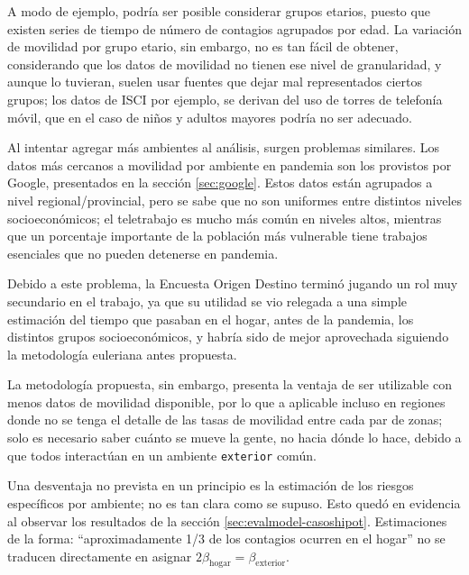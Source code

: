 A modo de ejemplo, podría ser posible considerar grupos etarios, puesto que existen series de tiempo de número de contagios agrupados por edad. La variación de movilidad por grupo etario, sin embargo, no es tan fácil de obtener, considerando que los datos de movilidad no tienen ese nivel de granularidad, y aunque lo tuvieran, suelen usar fuentes que dejar mal representados ciertos grupos; los datos de ISCI por ejemplo, se derivan del uso de torres de telefonía móvil, que en el caso de niños y adultos mayores podría no ser adecuado.

Al intentar agregar más ambientes al análisis, surgen problemas similares. Los datos más cercanos a movilidad por ambiente en pandemia son los provistos por Google, presentados en la sección \ref{sec:google}. Estos datos están agrupados a nivel regional/provincial, pero se sabe \cite{Olivares2020} que no son uniformes entre distintos niveles socioeconómicos; el teletrabajo es mucho más común en niveles altos, mientras que un porcentaje importante de la población más vulnerable tiene trabajos esenciales que no pueden detenerse en pandemia.

Debido a este problema, la Encuesta Origen Destino terminó jugando un rol muy secundario en el trabajo, ya que su utilidad se vio relegada a una simple estimación del tiempo que pasaban en el hogar, antes de la pandemia, los distintos grupos socioeconómicos, y habría sido de mejor aprovechada siguiendo la metodología euleriana antes propuesta. 

La metodología propuesta, sin embargo, presenta la ventaja de ser utilizable con menos datos de movilidad disponible, por lo que a aplicable incluso en regiones donde no se tenga el detalle de las tasas de movilidad entre cada par de zonas; solo es necesario saber cuánto se mueve la gente, no hacia dónde lo hace, debido a que todos interactúan en un ambiente \texttt{exterior} común.

Una desventaja no prevista en un principio es la estimación de los riesgos específicos por ambiente; no es tan clara como se supuso. Esto quedó en evidencia al observar los resultados de la sección \ref{sec:evalmodel-casoshipot}. Estimaciones de la forma: ``aproximadamente 1/3 de los contagios ocurren en el hogar'' \cite{Ferguson2020} no se traducen directamente en asignar \( 2 \beta_{\text{hogar}} = \beta_{\text{exterior}}\).


